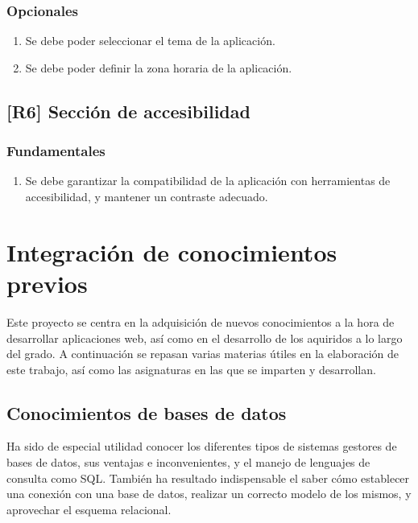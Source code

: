 \documentclass[10pt, a4paper]{aqademic}
\begin{document}
\subsubsection*{Opcionales}

\begin{enumerate}[label=\textbf{R5.\arabic*o}, leftmargin=10mm]
	\item Se debe poder seleccionar el tema de la aplicación.
	
	\item Se debe poder definir la zona horaria de la aplicación.	
\end{enumerate}


\subsection*{[R6] Sección de accesibilidad}

\subsubsection*{Fundamentales}

\begin{enumerate}[label=\textbf{R6.\arabic*f}, leftmargin=10mm]
	\item Se debe garantizar la compatibilidad de la aplicación con herramientas de accesibilidad, y mantener un contraste adecuado.
\end{enumerate}


\section{Integración de conocimientos previos}

Este proyecto se centra en la adquisición de nuevos conocimientos a la hora de desarrollar aplicaciones web, así como en el desarrollo de los aquiridos a lo largo del grado. A continuación se repasan varias materias útiles en la elaboración de este trabajo, así como las asignaturas en las que se imparten y desarrollan.

\subsection*{Conocimientos de bases de datos}

Ha sido de especial utilidad conocer los diferentes tipos de sistemas gestores de bases de datos, sus ventajas e inconvenientes, y el manejo de lenguajes de 
consulta como SQL. También ha resultado indispensable el saber cómo establecer una conexión con una base de datos, realizar un correcto modelo de los mismos, 
y aprovechar el esquema relacional.
\end{document}
